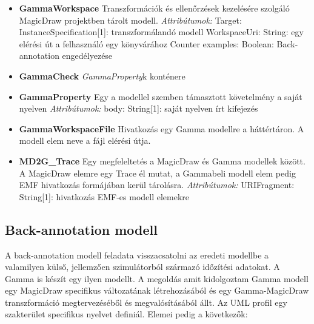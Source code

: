 \begin{itemize}
	\item \textbf{GammaWorkspace} \newline
	Transzformációk és ellenőrzések kezelésére szolgáló MagicDraw projektben tárolt modell.
	\newline
	\textit{Attribútumok:}
	\subitem Target: InstanceSpecification[1]: transzformálandó modell
	\subitem WorkspaceUri: String: egy elérési út a felhasználó egy könyvárához
	\subitem Counter examples: Boolean: Back-annotation engedélyezése
	
	\item \textbf{GammaCheck} \newline
	\emph{GammaProperty}k konténere
	
	\item \textbf{GammaProperty} \newline
	Egy a modellel szemben támasztott követelmény a saját nyelven
	\newline
	\textit{Attribútumok:}
	\subitem body: String[1]: saját nyelven írt kifejezés

	\item \textbf{GammaWorkspaceFile} \newline
	Hivatkozás egy Gamma modellre a háttértáron. A modell elem neve a fájl elérési útja.
	
	\item \textbf{MD2G\_Trace} \newline
	Egy megfeleltetés a MagicDraw és Gamma modellek között. A MagicDraw elemre egy Trace él mutat, a Gammabeli modell elem pedig EMF hivatkozás formájában kerül tárolásra.
	\newline
	\textit{Attribútumok:}
	\subitem URIFragment: String[1]: hivatkozás EMF-es modell elemekre
	
	
\end{itemize}

\subsection{Back-annotation modell}
A back-annotation modell feladata visszacsatolni az eredeti modellbe a valamilyen külső, jellemzően szimulátorból származó időzítési adatokat. A Gamma is készít egy ilyen modellt. A megoldás amit kidolgoztam Gamma modell egy MagicDraw specifikus változatának létrehozásából és egy Gamma-MagicDraw transzformáció megtervezéséből és megvalósításából állt. Az UML profil egy szakterület specifikus nyelvet definiál. Elemei pedig a következők:

